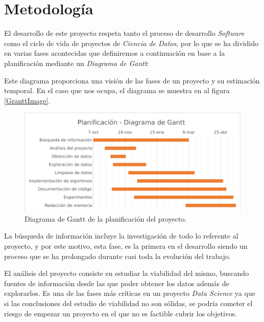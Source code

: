 
\chapter{Metodología}
\label{metodologia}

El desarrollo de este proyecto respeta tanto el proceso de desarrollo \textit{Software} como el ciclo de vida de proyectos de \textit{Ciencia de Datos}, por lo que se ha dividido en varias fases acontecidas que definiremos a continuación en base a la planificación mediante un \textit{Diagrama de Gantt}:

Este diagrama proporciona una visión de las fases de un proyecto y su estimación temporal. En el caso que nos ocupa, el diagrama se muestra en al figura \eqref{GranttImage}.
\begin{figure}[H]
    \centering
    \includegraphics[width=15cm]{archivos/4.Metodologia/GranttImage}
    \caption{Diagrama de Gantt de la planificación del proyecto.}
    \label{GranttImage}
\end{figure}

La búsqueda de información incluye la investigación de todo lo referente al proyecto, y por este motivo, esta fase, es la primera en el desarrollo siendo un proceso que se ha prolongado durante casi toda la evolución del trabajo.

El análisis del proyecto consiste en estudiar la viabilidad del mismo, buscando fuentes de información desde las que poder obtener los datos además de explorarlos. Es una de las fases más críticas en un proyecto \textit{Data Science} ya que si las conclusiones del estudio de viabilidad no son sólidas, se podría cometer el riesgo de empezar un proyecto en el que no es factible cubrir los objetivos.

